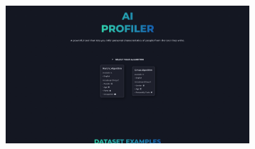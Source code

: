 \bigskip
\begin{figure}[H]
	\centering
	\begin{subfigure}[c]{0.74\textwidth}
			\centering
			\includegraphics[width=\textwidth]{imagenes/algorithms.png}
			\label{fig:casouso_algorithms_escritorio}
	\end{subfigure}
	\hfill
	\begin{subfigure}[c]{0.21\textwidth}
			\centering

\end{subfigure}
\end{figure}
